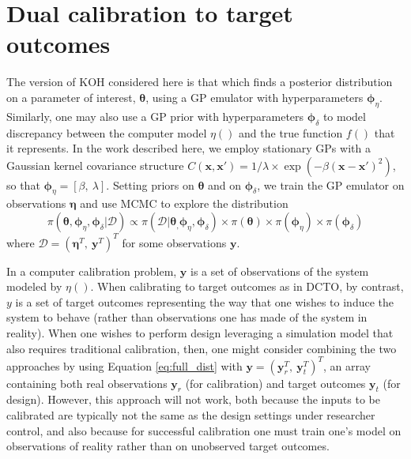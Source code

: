 \documentclass[12pt]{article}
\begin{document}
\section{Dual calibration to target outcomes}\label{sec:dcto}
%
The version of KOH considered here is that which finds a posterior distribution on a parameter of interest, $\boldsymbol\theta$, using a GP emulator with hyperparameters ${\boldsymbol\phi_\eta}$.
%
Similarly, one may also use a GP prior with hyperparameters $\boldsymbol\phi_\delta$ to model discrepancy between the computer model $\eta()$ and the true function $f()$ that it represents.
%
In the work described here, we employ stationary GPs with a Gaussian kernel covariance structure $C(\mathbf x,\mathbf x') = 1/\lambda \times \exp(-\beta(\mathbf x-\mathbf x')^2)$, so that ${\boldsymbol\phi_\eta} = \left[\beta,\ \lambda\right]$.
%
Setting priors on $\boldsymbol\theta$ and on $\boldsymbol \phi_\delta$, we train the GP emulator on observations $\boldsymbol \eta$ and use MCMC to explore the distribution
\begin{equation} \label{eq:full_dist}
\pi(\boldsymbol \theta,{\boldsymbol\phi_\eta},\boldsymbol \phi_\delta|\mathcal D)
\propto \pi(\mathcal D | \boldsymbol \theta_,{\boldsymbol\phi_\eta}, \boldsymbol\phi_\delta) %
\times \pi(\boldsymbol\theta)
\times \pi(\boldsymbol\phi_\eta)
\times \pi(\boldsymbol\phi_\delta)
\end{equation}
%
where $\mathcal D = (\boldsymbol\eta^T,\ \mathbf y^T)^T$ for some observations $\mathbf y$.
%

%
In a computer calibration problem, $\mathbf y$ is a set of observations of the system modeled by $\eta()$.
%
When calibrating to target outcomes as in DCTO, by contrast, $y$ is a set of target outcomes representing the way that one wishes to induce the system to behave (rather than observations one has made of the system in reality).
%
When one wishes to perform design leveraging a simulation model that also requires traditional calibration, then, one might consider combining the two approaches by using Equation \eqref{eq:full_dist} with $\mathbf y= (\mathbf y_r^T,\ \mathbf y_t^T)^T$, an array containing both real observations $\mathbf y_r$ (for calibration) and target outcomes $\mathbf y_t$ (for design).
%
However, this approach will not work, both because the inputs to be calibrated are typically not the same as the design settings under researcher control, and also because for successful calibration one must train one's model on observations of reality rather than on unobserved target outcomes.
%
\end{document}
